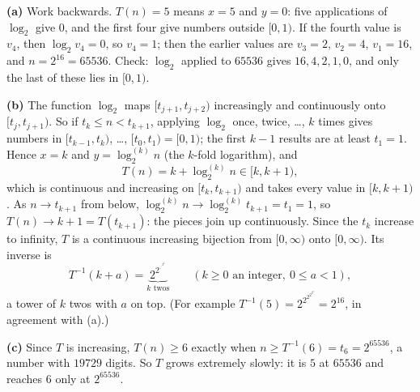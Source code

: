 \textbf{(a)} Work backwards. $T(n)=5$ means $x=5$ and $y=0$: five applications of $\log_2$ give $0$, and the first four give numbers outside $[0,1)$. If the fourth value is $v_4$, then $\log_2v_4=0$, so $v_4=1$; then the earlier values are $v_3=2$, $v_2=4$, $v_1=16$, and $n=2^{16}=\boxed{65536}$. Check: $\log_2$ applied to $65536$ gives $16,4,2,1,0$, and only the last of these lies in $[0,1)$.

\textbf{(b)} The function $\log_2$ maps $[t_{j+1},t_{j+2})$ increasingly and continuously onto $[t_j,t_{j+1})$. So if $t_k\le n<t_{k+1}$, applying $\log_2$ once, twice, \dots, $k$ times gives numbers in $[t_{k-1},t_k)$, \dots, $[t_0,t_1)=[0,1)$; the first $k-1$ results are at least $t_1=1$. Hence $x=k$ and $y=\log_2^{(k)}n$ (the $k$-fold logarithm), and
\[T(n)=k+\log_2^{(k)}n\in[k,k+1),\]
which is continuous and increasing on $[t_k,t_{k+1})$ and takes every value in $[k,k+1)$. As $n\to t_{k+1}$ from below, $\log_2^{(k)}n\to\log_2^{(k)}t_{k+1}=t_1=1$, so $T(n)\to k+1=T(t_{k+1})$: the pieces join up continuously. Since the $t_k$ increase to infinity, $T$ is a continuous increasing bijection from $[0,\infty)$ onto $[0,\infty)$. Its inverse is
\[T^{-1}(k+a)=\underbrace{2^{2^{\cdot^{\cdot^{2^{a}}}}}}_{k\text{ twos}}\qquad(k\ge0\text{ an integer},\ 0\le a<1),\]
a tower of $k$ twos with $a$ on top. (For example $T^{-1}(5)=2^{2^{2^{2^{2^0}}}}=2^{16}$, in agreement with (a).)

\textbf{(c)} Since $T$ is increasing, $T(n)\ge6$ exactly when $n\ge T^{-1}(6)=t_6=\boxed{2^{65536}}$, a number with $19729$ digits. So $T$ grows extremely slowly: it is $5$ at $65536$ and reaches $6$ only at $2^{65536}$.
